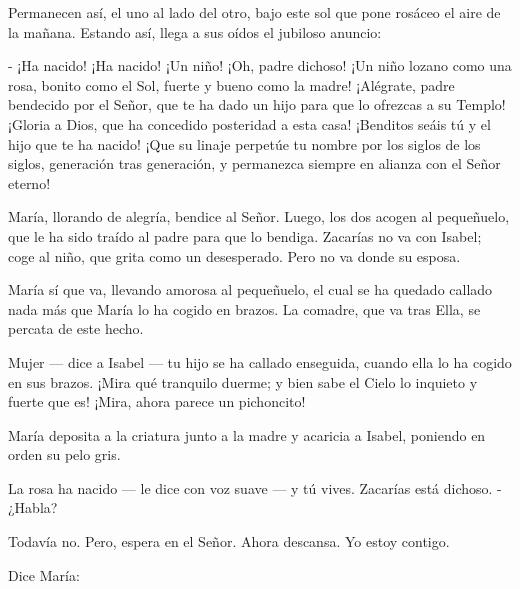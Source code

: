 \documentclass[12pt]{book} %
\begin{document}
Permanecen así, el uno al lado del otro, bajo este sol que pone rosáceo el aire de la mañana. Estando así, llega a sus oídos el jubiloso anuncio: 

- ¡Ha nacido! ¡Ha nacido! ¡Un niño! ¡Oh, padre dichoso! ¡Un niño lozano como una rosa, bonito como el Sol, fuerte y bueno como la madre! ¡Alégrate, padre bendecido por el Señor, que te ha dado un hijo para que lo ofrezcas a su Templo! ¡Gloria a Dios, que ha concedido posteridad a esta casa! ¡Benditos seáis tú y el hijo que te ha nacido! ¡Que su linaje perpetúe tu nombre por los siglos de los siglos, generación tras generación, y permanezca siempre en alianza con el Señor eterno! 

María, llorando de alegría, bendice al Señor. Luego, los dos acogen al pequeñuelo, que le ha sido traído al padre para que lo bendiga. Zacarías no va con Isabel; coge al niño, que grita como un desesperado. Pero no va donde su esposa. 

María sí que va, llevando amorosa al pequeñuelo, el cual se ha quedado callado nada más que María lo ha cogido en brazos. La comadre, que va tras Ella, se percata de este hecho. 

Mujer — dice a Isabel — tu hijo se ha callado enseguida, cuando ella lo ha cogido en sus brazos. ¡Mira qué tranquilo duerme; y bien sabe el Cielo lo inquieto y fuerte que es! ¡Mira, ahora parece un pichoncito! 

María deposita a la criatura junto a la madre y acaricia a Isabel, poniendo en orden su pelo gris. 

La rosa ha nacido — le dice con voz suave — y tú vives. Zacarías está dichoso. - ¿Habla? 

Todavía no. Pero, espera en el Señor. Ahora descansa. Yo estoy contigo. 

Dice María: 
\end{document}
